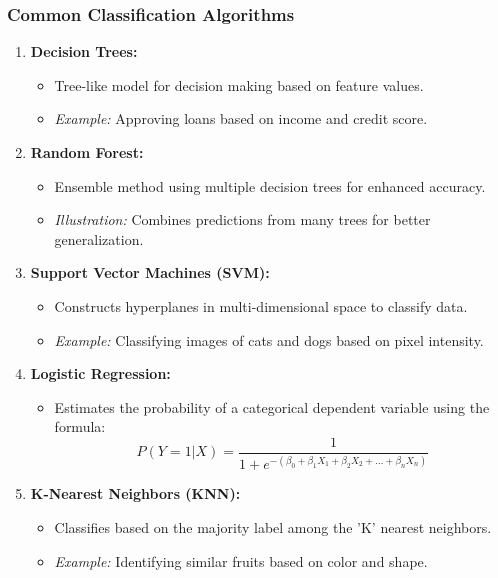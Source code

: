 \documentclass{beamer}
\begin{document}
\begin{frame}[fragile]
    \frametitle{Common Classification Algorithms}
    \begin{enumerate}
        \item \textbf{Decision Trees:} 
            \begin{itemize}
                \item Tree-like model for decision making based on feature values.
                \item \textit{Example:} Approving loans based on income and credit score.
            \end{itemize}
            
        \item \textbf{Random Forest:} 
            \begin{itemize}
                \item Ensemble method using multiple decision trees for enhanced accuracy.
                \item \textit{Illustration:} Combines predictions from many trees for better generalization.
            \end{itemize}
            
        \item \textbf{Support Vector Machines (SVM):} 
            \begin{itemize}
                \item Constructs hyperplanes in multi-dimensional space to classify data.
                \item \textit{Example:} Classifying images of cats and dogs based on pixel intensity.
            \end{itemize}
            
        \item \textbf{Logistic Regression:} 
            \begin{itemize}
                \item Estimates the probability of a categorical dependent variable using the formula:
                \begin{equation}
                P(Y=1|X) = \frac{1}{1 + e^{-(\beta_0 + \beta_1X_1 + \beta_2X_2 + \ldots + \beta_nX_n)}}
                \end{equation}
            \end{itemize}
            
        \item \textbf{K-Nearest Neighbors (KNN):} 
            \begin{itemize}
                \item Classifies based on the majority label among the 'K' nearest neighbors.
                \item \textit{Example:} Identifying similar fruits based on color and shape.
            \end{itemize}
    \end{enumerate}
\end{frame}
\end{document}
